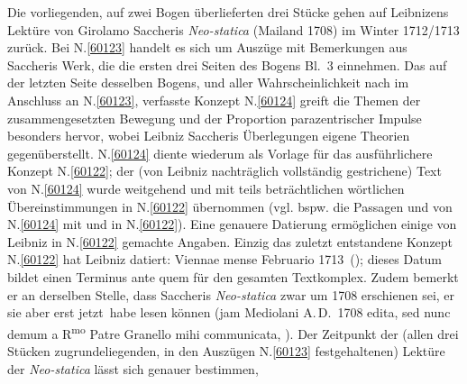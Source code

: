
\vspace{5mm}
\begin{ledgroup}
\footnotesize
\pstart
\noindent
Die vorliegenden, auf zwei Bogen überlieferten drei Stücke gehen auf Leibnizens Lektüre von 
Girolamo Saccheris 
\cite{00541}\textit{Neo-statica} (Mailand 1708) im Winter 1712/1713 
zurück.
\pend
\pstart
Bei N.\;\ref{60123} handelt es sich um Auszüge mit Bemerkungen aus 
Saccheris \cite{00541}Werk, 
die die ersten drei Seiten des Bogens Bl.~3 einnehmen.
Das auf der letzten Seite desselben Bogens, und aller Wahrscheinlichkeit nach im Anschluss an N.\;\ref{60123}, verfasste Konzept N.\;\ref{60124} 
greift die Themen der zusammengesetzten Bewegung und der Proportion parazentrischer Impulse besonders hervor, wobei Leibniz
Saccheris Überlegungen 
eigene Theorien gegenüberstellt.
N.\;\ref{60124} diente wiederum als Vorlage für das ausführlichere Konzept N.\;\ref{60122}; 
der (von Leibniz nachträglich vollständig gestrichene) Text von N.\;\ref{60124} 
wurde weitgehend und mit teils beträchtlichen wörtlichen Übereinstimmungen
in N.\;\ref{60122} übernommen
(vgl. bspw. die Passagen  und  von N.\;\ref{60124} mit  und  in N.\;\ref{60122}).
Eine genauere Datierung ermöglichen einige von Leibniz in N.\;\ref{60122} gemachte Angaben.
\pend
\pstart
Einzig das zuletzt entstandene Konzept N.\;\ref{60122} hat Leibniz datiert: \glqq Viennae mense Februario 1713\grqq\ (); 
dieses Datum bildet einen Terminus ante quem für den gesamten Textkomplex.
Zudem bemerkt er an derselben Stelle, dass  
Saccheris 
\cite{00541}\textit{Neo-statica} zwar um 1708 erschienen sei,
er sie aber \glqq erst jetzt\grqq\ habe lesen können (\glqq jam Mediolani A.\,D.~1708 edita, sed nunc demum a R\textsuperscript{mo} Patre Granello 
mihi communicata\grqq, ).
Der Zeitpunkt der (allen drei Stücken zugrundeliegenden, in den Auszügen N.\;\ref{60123} festgehaltenen) 
Lektüre der \cite{00541}\textit{Neo-statica} lässt sich genauer bestimmen,

\end{ledgroup}

